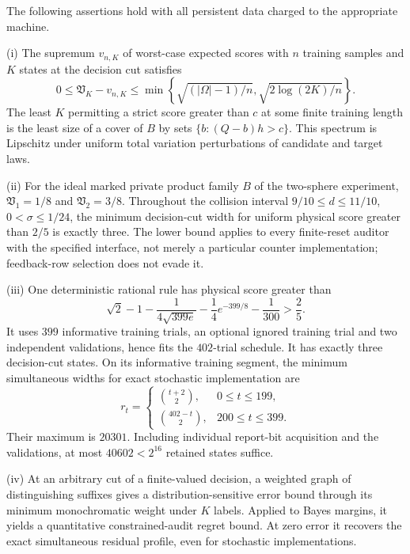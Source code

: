 \begin{theorem}
\label{thm:v20-main}
The following assertions hold with all persistent data charged to the
appropriate machine.

\smallskip\noindent
\textup{(i)} The supremum $v_{n,K}$ of worst-case expected scores with
$n$ training samples and $K$ states at the decision cut satisfies
\[
 0\le\mathfrak V_K-v_{n,K}
 \le\min\left\{\sqrt{(|\Omega|-1)/n},
                    \sqrt{2\log(2K)/n}\right\}.
\]
The least $K$ permitting a strict score greater than $c$ at some finite
training length is the least size of a cover of $B$ by sets
$\{b:(Q-b)h>c\}$. This spectrum is Lipschitz under uniform total
variation perturbations of candidate and target laws.

\smallskip\noindent
\textup{(ii)} For the ideal marked private product family $B$ of the
two-sphere experiment, $\mathfrak V_1=1/8$ and
$\mathfrak V_2=3/8$. Throughout the collision interval
$9/10\le d\le11/10$, $0<\sigma\le1/24$, the minimum decision-cut
width for uniform physical score greater than $2/5$ is exactly three.
The lower bound applies to every finite-reset auditor with the specified
interface, not merely a particular counter implementation; feedback-row selection
does not evade it.

\smallskip\noindent
\textup{(iii)} One deterministic rational rule has physical score greater
than
\[
 \sqrt2-1-\frac1{4\sqrt{399e}}-\frac14e^{-399/8}-\frac1{300}
                         >\frac25.
\]
It uses $399$ informative training trials, an optional ignored training
trial and two independent validations, hence fits the $402$-trial
schedule. It has exactly three decision-cut states. On its informative
training segment, the minimum simultaneous widths for exact stochastic
implementation are
\[
 r_t=\begin{cases}
 \binom{t+2}{2},&0\le t\le199,\\
 \binom{402-t}{2},&200\le t\le399.
 \end{cases}
\]
Their maximum is $20301$. Including individual report-bit acquisition
and the validations, at most $40602<2^{16}$ retained states suffice.

\smallskip\noindent
\textup{(iv)} At an arbitrary cut of a finite-valued decision, a weighted
graph of distinguishing suffixes gives a distribution-sensitive error
bound through its minimum monochromatic weight under $K$ labels.
Applied to Bayes margins, it yields a quantitative constrained-audit
regret bound. At zero error it recovers the exact simultaneous residual
profile, even for stochastic implementations.


\end{theorem}
